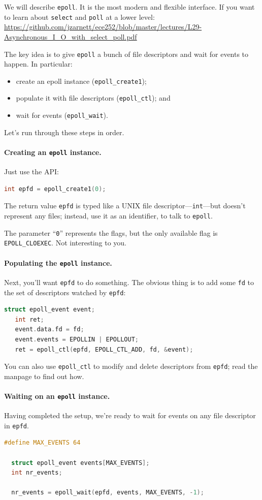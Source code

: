 \documentclass[a4paper]{report}
\begin{document}
We will describe {\tt epoll}. It is the most modern and
flexible interface. If you want to learn about \texttt{select} and \texttt{poll} at a lower level: \url{https://github.com/jzarnett/ece252/blob/master/lectures/L29-Asynchronous_I_O_with_select_poll.pdf }

The key idea is to give {\tt epoll} a bunch of file descriptors and
wait for events to happen. In particular:
     \begin{itemize}
       \item create an epoll instance ({\tt epoll\_create1});
       \item populate it with file descriptors ({\tt epoll\_ctl}); and
       \item wait for events ({\tt epoll\_wait}).
     \end{itemize}
Let's run through these steps in order.

\paragraph{Creating an {\tt epoll} instance.} Just use the API:
    \begin{lstlisting}[language=C]
   int epfd = epoll_create1(0);
    \end{lstlisting}

The return value {\tt epfd} is typed like a UNIX file
descriptor---{\tt int}---but doesn't represent any files; instead, use
it as an identifier, to talk to {\tt epoll}.

The parameter ``{\tt 0}'' represents the flags, but the only available flag
is {\tt EPOLL\_CLOEXEC}. Not interesting to you.

\paragraph{Populating the {\tt epoll} instance.} Next, you'll want
{\tt epfd} to do something. The obvious thing is to add some {\tt fd}
to the set of descriptors watched by {\tt epfd}:
    \begin{lstlisting}[language=C]
   struct epoll_event event;
   int ret;
   event.data.fd = fd;
   event.events = EPOLLIN | EPOLLOUT;
   ret = epoll_ctl(epfd, EPOLL_CTL_ADD, fd, &event);
    \end{lstlisting}

You can also use {\tt epoll\_ctl} to modify and delete descriptors from {\tt epfd}; read the manpage to find out how.

\paragraph{Waiting on an {\tt epoll} instance.} Having completed
the setup, we're ready to wait for events on any file descriptor in {\tt epfd}.
    \begin{lstlisting}[language=C]
  #define MAX_EVENTS 64

  struct epoll_event events[MAX_EVENTS];
  int nr_events;

  nr_events = epoll_wait(epfd, events, MAX_EVENTS, -1);
    \end{lstlisting}
\end{document}
